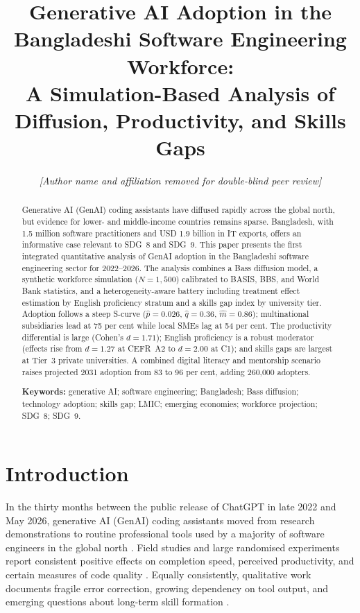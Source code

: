 \documentclass[11pt,a4paper]{article}
\title{\bfseries Generative AI Adoption in the Bangladeshi Software
       Engineering Workforce:\\
       A Simulation-Based Analysis of Diffusion, Productivity, and
       Skills Gaps}
\author{\textit{[Author name and affiliation removed for double-blind peer review]}}
\date{}
\begin{document}

\maketitle

\begin{abstract}
\noindent
Generative AI (GenAI) coding assistants have diffused rapidly across
the global north, but evidence for lower- and middle-income countries
remains sparse. Bangladesh, with 1.5 million software practitioners
and USD 1.9 billion in IT exports, offers an informative case
relevant to SDG~8 and SDG~9. This paper presents the first integrated
quantitative analysis of GenAI adoption in the Bangladeshi software
engineering sector for 2022--2026. The analysis combines a Bass
diffusion model, a synthetic workforce simulation ($N=1{,}500$)
calibrated to BASIS, BBS, and World Bank statistics, and a
heterogeneity-aware battery including treatment effect estimation by
English proficiency stratum and a skills gap index by university
tier. Adoption follows a steep S-curve ($\hat{p}=0.026$,
$\hat{q}=0.36$, $\hat{m}=0.86$); multinational subsidiaries lead at
75 per cent while local SMEs lag at 54 per cent. The productivity
differential is large (Cohen's $d=1.71$); English proficiency is a
robust moderator (effects rise from $d=1.27$ at CEFR~A2 to $d=2.00$
at C1); and skills gaps are largest at Tier~3 private universities. A
combined digital literacy and mentorship scenario raises projected
2031 adoption from 83 to 96 per cent, adding 260{,}000 adopters.

\vspace{0.6em}
\noindent\textbf{Keywords:} generative AI; software engineering;
Bangladesh; Bass diffusion; technology adoption; skills gap; LMIC;
emerging economies; workforce projection; SDG~8; SDG~9.
\end{abstract}

\clearpage

\section{Introduction}

In the thirty months between the public release of ChatGPT in late
2022 and May 2026, generative AI (GenAI) coding assistants moved from
research demonstrations to routine professional tools used by a
majority of software engineers in the global north
\citep{StackOverflow2025,GitHubOctoverse2024}. Field studies and large
randomised experiments report consistent positive effects on
completion speed, perceived productivity, and certain measures of
code quality
\citep{PengKalliamvakouEtAl2023,NoyZhang2023,CuiDemirerEtAl2025,BrynjolfssonLiRaymond2025,ZieglerEtAl2024}.
Equally consistently, qualitative work documents fragile error
correction, growing dependency on tool output, and emerging questions
about long-term skill formation
\citep{Vaithilingam2022,BarkeJamesPolikarpova2023,LiangYangMyers2024,MozannarEtAl2024}.
\end{document}
